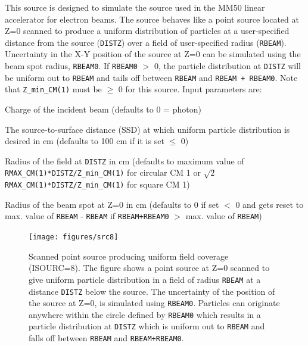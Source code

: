 \documentclass[12pt,twoside]{article}
\begin{document}
This source is designed to simulate the source used in the MM50 linear
accelerator for electron beams.
The source behaves like a point source
located at Z=0 scanned to produce a uniform distribution of particles at
a user-specified distance from the source ({\tt DISTZ}) over a field
of user-specified radius ({\tt RBEAM}).  Uncertainty in the X-Y position
of the source at Z=0 can be simulated using the beam spot radius, {\tt RBEAM0}.
If {\tt RBEAM0} $>$ 0,
the particle distribution at {\tt DISTZ}
will be uniform out to {\tt RBEAM} and tails off between
{\tt RBEAM} and {\tt RBEAM + RBEAM0}.
Note that \verb+Z_min_CM(1)+ must be $\geq$ 0 for this source.
Input parameters are:
\begin{description}
\item [IQIN] Charge of the incident beam (defaults to 0 = photon)
\item [DISTZ] The source-to-surface distance (SSD) at which uniform
particle distribution is desired in cm (defaults to 100 cm if it is set $\leq$ 0)
\item [RBEAM] Radius of the field at \verb+DISTZ+ in cm (defaults to maximum
value of \\
{\tt RMAX\_CM(1)*DISTZ/Z\_min\_CM(1)} for circular CM 1 or
$\sqrt{2}${\tt RMAX\_CM(1)*DISTZ/Z\_min\_CM(1)} for square CM 1)
\item [RBEAM0] Radius of the beam spot at Z=0 in cm (defaults to 0 if
set $<$ 0 and gets reset to
max. value of {\tt RBEAM} - {\tt RBEAM} if
{\tt RBEAM+RBEAM0} $>$ max. value of {\tt RBEAM})
\end{description}
\vspace*{-0.5cm}
\begin{figure}[htbp]
\begin{center}
\leavevmode
\mbox{}\hspace{0cm}
\texttt{[image: figures/src8]}
\caption[ISOURC=8: Scanned circular uniform source.]
{Scanned point source producing uniform field coverage (ISOURC=8).  The figure
shows a point source at
Z=0 scanned to give uniform particle distribution in a field of radius
{\tt RBEAM} at a distance {\tt DISTZ} below the source.  The uncertainty
of the position of the source at Z=0, is simulated using {\tt RBEAM0}.
Particles can originate anywhere within the circle defined by {\tt RBEAM0}
which results in a particle distribution at {\tt DISTZ} which is uniform
out to {\tt RBEAM} and falls off between {\tt RBEAM} and {\tt RBEAM+RBEAM0}.}
\label{fig_src8}
\end{center}
\end{figure}
\end{document}
